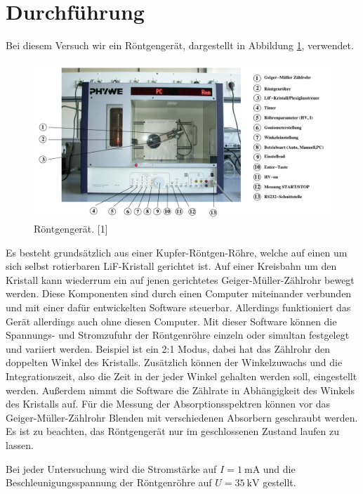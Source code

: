 \section{Durchführung}
\label{sec:Durchführung}

Bei diesem Versuch wir ein Röntgengerät, dargestellt in Abbildung 
\ref{fig:Aufbau}, verwendet. 

\begin{figure}
\centering
\includegraphics[scale=0.5]{content/aufbau1.png}
\caption{Röntgengerät. [1]}
\label{fig:Aufbau}
\end{figure}

Es besteht grundsätzlich aus einer Kupfer-Röntgen-Röhre, welche auf einen 
um sich selbst rotierbaren LiF-Kristall gerichtet ist. Auf einer Kreisbahn 
um den Kristall kann wiederrum ein auf jenen gerichtetes Geiger-Müller-Zählrohr
bewegt werden.
Diese Komponenten sind durch einen Computer miteinander verbunden und mit einer
dafür entwickelten Software steuerbar. Allerdings funktioniert das Gerät allerdings
auch ohne diesen Computer. Mit dieser Software können die Spannungs-
und Stromzufuhr der Röntgenröhre einzeln oder simultan festgelegt und variiert 
werden. Beispiel ist ein 2:1 Modus, dabei hat das Zählrohr den doppelten 
Winkel des Kristalls.
Zusätzlich können der Winkelzuwachs und die Integrationszeit, also die Zeit in der 
jeder Winkel gehalten werden soll, eingestellt werden. 
Außerdem nimmt die Software die Zählrate in Abhängigkeit des Winkels des Kristalls 
auf. Für die Messung der Absorptionsspektren können vor das Geiger-Müller-Zählrohr
Blenden mit verschiedenen Absorbern geschraubt werden. 
Es ist zu beachten, das Röntgengerät nur im geschlossenen Zustand laufen zu lassen. 

Bei jeder Untersuchung wird die Stromstärke auf $I = \SI{1}{\milli\ampere}$ und die 
Beschleunigungsspannung der Röntgenröhre auf $U = \SI{35}{\kilo\volt}$ gestellt. 

